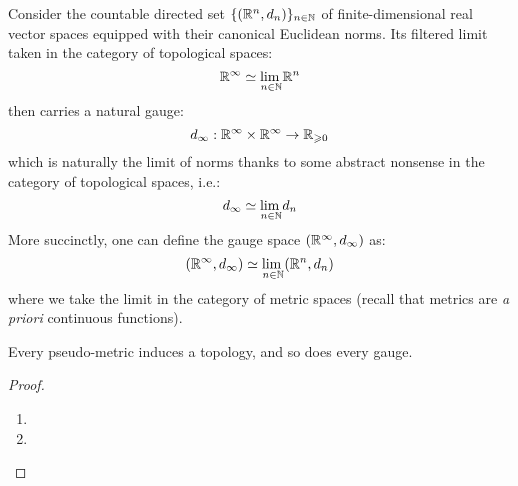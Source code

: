                 \begin{example}
                    Consider the countable directed set $\{(\mathbb{R}^n, d_n)\}_{n \in \mathbb{N}}$ of finite-dimensional real vector spaces equipped with their canonical Euclidean norms. Its filtered limit taken in the category of topological spaces:
                        $$\mathbb{R}^{\infty} \simeq \underset{n \in \mathbb{N}}{\operatorname{lim} \:} \mathbb{R}^n$$
                    then carries a natural gauge:
                        $$d_{\infty}: \R^{\infty} \x \R^{\infty} \to \R_{\geq 0}$$
                    which is naturally the limit of norms thanks to some abstract nonsense in the category of topological spaces, i.e.:
                        $$d_{\infty} \simeq \underset{n \in \mathbb{N}}{\operatorname{lim} \:} d_n$$
                    More succinctly, one can define the gauge space $(\mathbb{R}^{\infty}, d_{\infty})$ as:
                        $$(\mathbb{R}^{\infty}, d_{\infty}) \simeq \underset{n \in \mathbb{N}}{\operatorname{lim} \:} (\mathbb{R}^n, d_n)$$
                    where we take the limit in the category of metric spaces (recall that metrics are \textit{a priori} continuous functions).
                \end{example}
                
                \begin{proposition} \label{prop: topologies_induced_by_pseudo_metrics_and_gauges}
                    Every pseudo-metric induces a topology, and so does every gauge.
                \end{proposition}
                    \begin{proof}
                       \noindent
                       \begin{enumerate}
                           \item 
                           \item 
                       \end{enumerate}
                    \end{proof}
                

